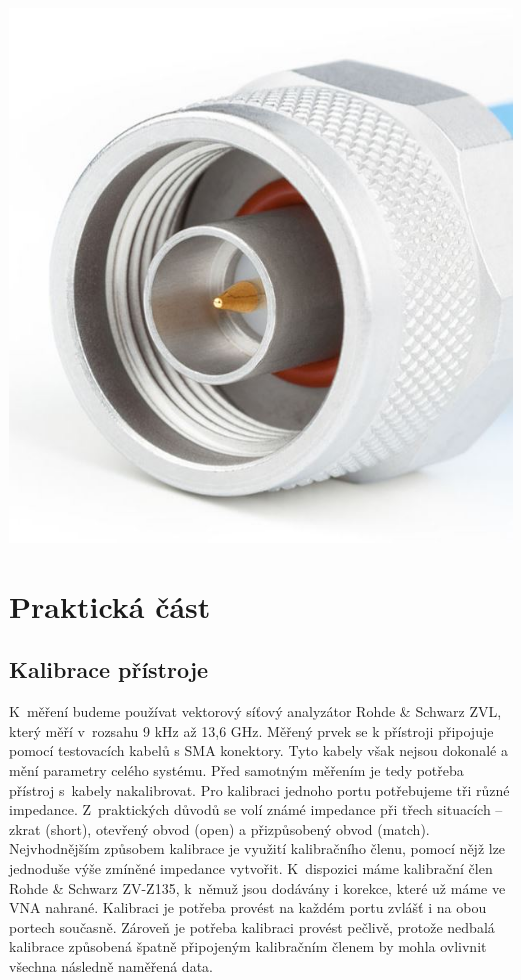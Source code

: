 \documentclass{protokol}
\begin{document}
\begin{center}
\begin{minipage}{0.29\textwidth}
		\includegraphics[width=\textwidth]{connector-n}
		\label{N}
	\end{minipage}
\end{center}

\section{Praktická část}
\subsection{Kalibrace přístroje}
K~měření budeme používat vektorový síťový analyzátor Rohde \& Schwarz ZVL,
který měří v~rozsahu 9 kHz až 13,6 GHz.
Měřený prvek se k přístroji připojuje pomocí testovacích kabelů s SMA konektory.
Tyto kabely však nejsou dokonalé a mění parametry celého systému.
Před samotným měřením je tedy potřeba přístroj s~kabely nakalibrovat.
Pro kalibraci jednoho portu potřebujeme tři různé impedance.
Z~praktických důvodů se volí známé impedance při třech situacích -- zkrat (short),
otevřený obvod (open) a přizpůsobený obvod (match).
Nejvhodnějším způsobem kalibrace je využití kalibračního členu,
pomocí nějž lze jednoduše výše zmíněné impedance vytvořit.
K~dispozici máme kalibrační člen Rohde \& Schwarz ZV-Z135,
k~němuž jsou dodávány i korekce, které už máme ve VNA nahrané.
Kalibraci je potřeba provést na každém portu zvlášť i na obou portech současně.
Zároveň je potřeba kalibraci provést pečlivě,
protože nedbalá kalibrace způsobená špatně připojeným kalibračním členem
by mohla ovlivnit všechna následně naměřená data.
\end{document}
